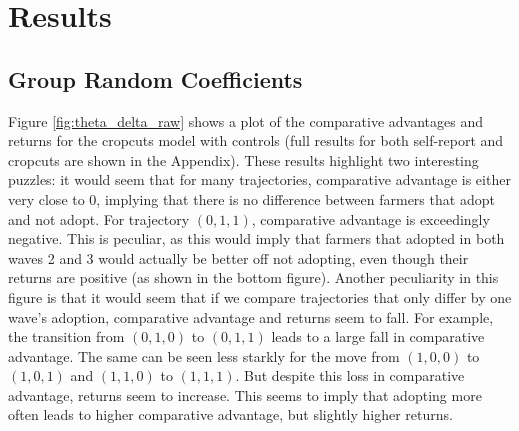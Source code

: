 \documentclass[11pt]{article}
\begin{document}
\section{Results}\label{sec:results}

\subsection{Group Random Coefficients}




Figure \ref{fig:theta_delta_raw} shows a plot of the comparative advantages and returns for the cropcuts model with controls (full results for both self-report and cropcuts are shown in the Appendix). These results highlight two interesting puzzles: it would seem that for many trajectories, comparative advantage is either very close to 0, implying that there is no difference between farmers that adopt and not adopt. For trajectory $(0,1,1)$, comparative advantage is exceedingly negative. This is peculiar, as this would imply that farmers that adopted in both waves 2 and 3 would actually be better off not adopting, even though their returns are positive (as shown in the bottom figure). Another peculiarity in this figure is that it would seem that if we compare trajectories that only differ by one wave's adoption, comparative advantage and returns seem to fall. For example, the transition from $(0,1,0)$ to $(0,1,1)$ leads to a large fall in comparative advantage. The same can be seen less starkly for the move from $(1,0,0)$ to $(1,0,1)$ and $(1,1,0)$ to $(1,1,1)$. But despite this loss in comparative advantage, returns seem to increase. This seems to imply that adopting more often leads to higher comparative advantage, but slightly higher returns. 
\end{document}
